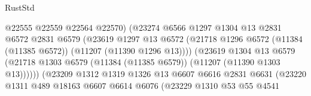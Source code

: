 \begin{lexlean}{RustStd}
\begin{coremodule}
                                          @22555
                                          @22559
                                          @22564
                                          @22570)
                                        (@23274
                                          @6566
                                          @1297
                                          @1304
                                          @13
                                          @2831
                                          @6572
                                          @2831
                                          @6579
                                          (@23619
                                            @1297
                                            @13
                                            @6572
                                            (@21718
                                              @1296
                                              @6572
                                              (@11384 (@11385 @6572))
                                              (@11207 (@11390 @1296 @13))))
                                          (@23619
                                            @1304
                                            @13
                                            @6579
                                            (@21718
                                              @1303
                                              @6579
                                              (@11384 (@11385 @6579))
                                              (@11207 (@11390 @1303 @13))))))
                                      (@23209
                                        @1312
                                        @1319
                                        @1326
                                        @13
                                        @6607
                                        @6616
                                        @2831
                                        @6631
                                        (@23220
                                          @1311
                                          @489
                                          @18163
                                          @6607
                                          @6614
                                          @6076
                                          (@23229
                                            @1310
                                            @53
                                            @55
                                            @4541

\end{coremodule}
\end{lexlean}
